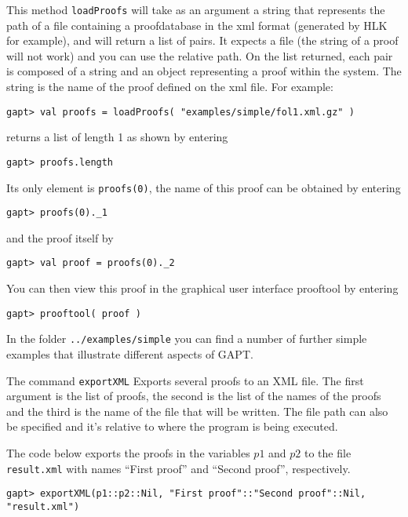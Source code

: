 \documentclass[a4paper,11pt]{article}
\newcommand{\cli}[1]{{\tt {#1}}}
\begin{document}
This method \texttt{loadProofs} will take as an argument a string that represents the path of a file
containing a proofdatabase in the xml format (generated by HLK for example), and will return a list 
of pairs. It expects a file (the string of a proof will not work) and you can use 
the relative path. On the list returned, each pair is composed of a string and 
an object representing a proof within the system. The string is the name of the 
proof defined on the xml file. For example:
%
\begin{lstlisting}
gapt> val proofs = loadProofs( "examples/simple/fol1.xml.gz" )
\end{lstlisting}
%
returns a list of length 1 as shown by entering
%
\begin{lstlisting}
gapt> proofs.length
\end{lstlisting}
%
Its only element is \cli{proofs(0)}, the name of this proof can be obtained by
entering
%
\begin{lstlisting}
gapt> proofs(0)._1
\end{lstlisting}
%
and the proof itself by
%
\begin{lstlisting}
gapt> val proof = proofs(0)._2
\end{lstlisting}
%
You can then view this proof in the graphical user interface prooftool by 
entering
%
\begin{lstlisting}
gapt> prooftool( proof )
\end{lstlisting}
%
In the folder \cli{../examples/simple} you can find a number of further simple
examples that illustrate different aspects of GAPT.


The command \texttt{exportXML} Exports several proofs to an XML file. The first argument is the list of proofs,
the second is the list of the names of the proofs and the third is the name of
the file that will be written. The file path can also be specified and it's
relative to where the program is being executed.

The code below exports the proofs in the variables $p1$ and $p2$ to the file
\texttt{result.xml} with names ``First proof'' and ``Second proof'',
respectively.
\begin{lstlisting}
gapt> exportXML(p1::p2::Nil, "First proof"::"Second proof"::Nil, "result.xml")
\end{lstlisting}

\end{document}
